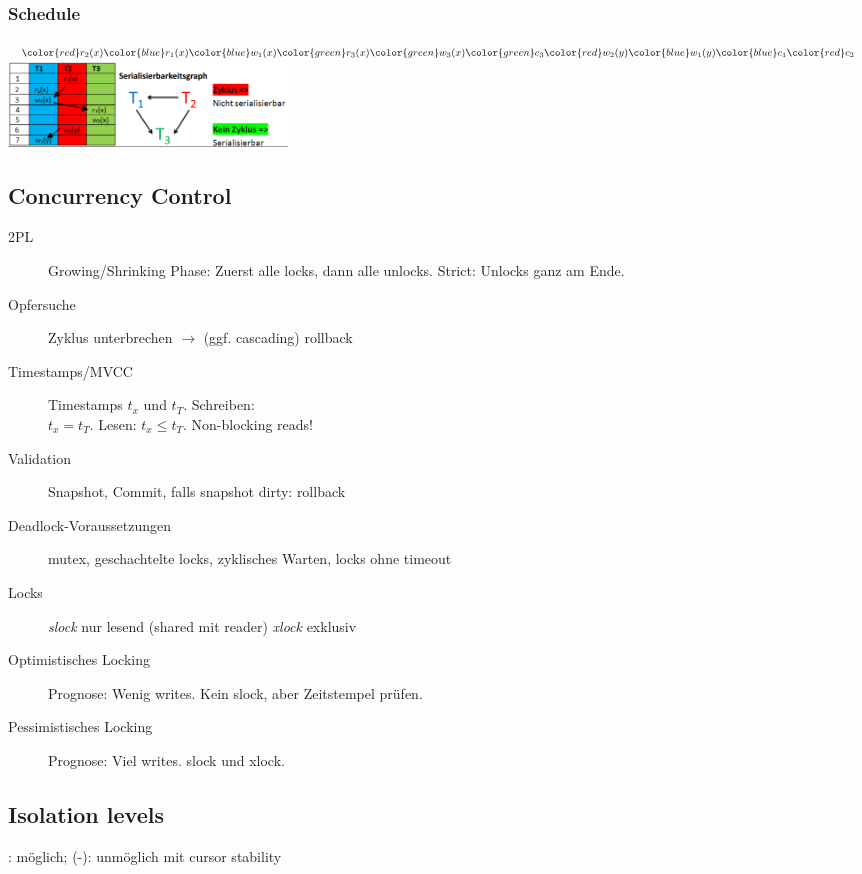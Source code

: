 \begin{multicols*}{3}
\newcommand{\ta}[2]{{\color{blue}#1_{1}#2}}
\newcommand{\tb}[2]{{\color{red}#1_{2}#2}}
\newcommand{\tc}[2]{{\color{green}#1_{3}#2}}

\subsubsection{Schedule}
$\tb{r}{(x)}\ta{r}{(x)}\ta{w}{(x)}\tc{r}{(x)}\tc{w}{(x)}\tc{c}{}\tb{w}{(y)}\ta{w}{(y)}\ta{c}{}\tb{c}{}$ \\
\includegraphics[width=20em]{serial.png}



\subsection{Concurrency Control}
\begin{description}
\item[2PL]{Growing/Shrinking Phase: Zuerst alle locks, dann alle unlocks. Strict: Unlocks ganz am Ende.}
\item[Opfersuche]{Zyklus unterbrechen $\rightarrow$ (ggf. cascading) rollback}
\item[Timestamps/MVCC]{Timestamps $t_x$ und $t_T$. Schreiben: \\ $t_x = t_T$.
    Lesen: $t_x \leq t_T$. Non-blocking reads!}
\item[Validation]{Snapshot, Commit, falls snapshot dirty: rollback}
\item[Deadlock-Voraussetzungen] mutex, geschachtelte locks, zyklisches Warten, locks ohne timeout
\item[Locks] \emph{slock} nur lesend (shared mit reader) \emph{xlock} exklusiv
\item[Optimistisches Locking] Prognose: Wenig writes. Kein slock, aber Zeitstempel prüfen.
\item[Pessimistisches Locking] Prognose: Viel writes. slock und xlock.
\end{description}

\subsection{Isolation levels}
\checked: möglich; (-): unmöglich mit cursor stability


\end{multicols*}
